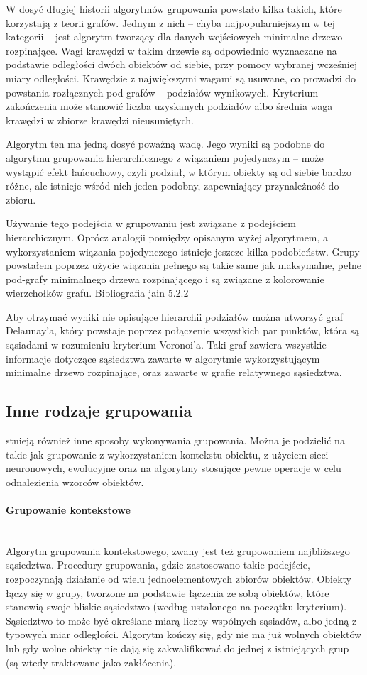 \documentclass{article}
\newcommand{\myparagraph}[1]{\paragraph{#1}\mbox{}\\}
\begin{document}
W dosyć długiej historii algorytmów grupowania powstało kilka takich, które korzystają z teorii grafów. Jednym z nich – chyba najpopularniejszym w tej kategorii – jest algorytm tworzący dla danych wejściowych minimalne drzewo rozpinające. Wagi krawędzi w takim drzewie są odpowiednio wyznaczane na podstawie odległości dwóch obiektów od siebie, przy pomocy wybranej wcześniej miary odległości. Krawędzie z największymi wagami są usuwane, co prowadzi do powstania rozłącznych pod-grafów – podziałów wynikowych. Kryterium zakończenia może stanowić liczba uzyskanych podziałów albo średnia waga krawędzi w zbiorze krawędzi nieusuniętych.

Algorytm ten ma jedną dosyć poważną wadę. Jego wyniki są podobne do algorytmu grupowania hierarchicznego z wiązaniem pojedynczym – może wystąpić efekt łańcuchowy, czyli podział, w którym obiekty są od siebie bardzo różne, ale istnieje wśród nich jeden podobny, zapewniający przynależność do zbioru.

Używanie tego podejścia w grupowaniu jest związane z podejściem hierarchicznym. Oprócz analogii pomiędzy opisanym wyżej algorytmem, a wykorzystaniem wiązania pojedynczego istnieje jeszcze kilka podobieństw. Grupy powstałem poprzez użycie wiązania pełnego są takie same jak maksymalne, pełne pod-grafy minimalnego drzewa rozpinającego i są związane z kolorowanie wierzchołków grafu. Bibliografia jain 5.2.2

Aby otrzymać wyniki nie opisujące hierarchii podziałów można utworzyć graf Delaunay'a, \cite[5.2.2]{jain_clustering} który powstaje poprzez połączenie wszystkich par punktów, która są sąsiadami w rozumieniu kryterium Voronoi'a. Taki graf zawiera wszystkie informacje dotyczące sąsiedztwa zawarte w  algorytmie wykorzystującym minimalne drzewo rozpinające, oraz zawarte w grafie relatywnego sąsiedztwa.

\subsection{Inne rodzaje grupowania} \label{other_clustering_methods_section}

stnieją również inne sposoby wykonywania grupowania. Można je podzielić na takie jak grupowanie z wykorzystaniem kontekstu obiektu, z użyciem sieci neuronowych, ewolucyjne oraz na algorytmy stosujące pewne operacje w celu odnalezienia wzorców obiektów.

\myparagraph{Grupowanie kontekstowe}

Algorytm grupowania kontekstowego, zwany jest też grupowaniem najbliższego sąsiedztwa. Procedury grupowania, gdzie zastosowano takie podejście, rozpoczynają działanie od wielu jednoelementowych zbiorów obiektów. Obiekty łączy się w grupy, tworzone na podstawie łączenia ze sobą obiektów, które stanowią swoje bliskie sąsiedztwo (według ustalonego na początku kryterium). Sąsiedztwo to może być określane miarą liczby wspólnych sąsiadów, albo jedną z typowych miar odległości. Algorytm kończy się, gdy nie ma już wolnych obiektów lub gdy wolne obiekty nie dają się zakwalifikować do jednej z istniejących grup (są wtedy traktowane jako zakłócenia).
\end{document}
